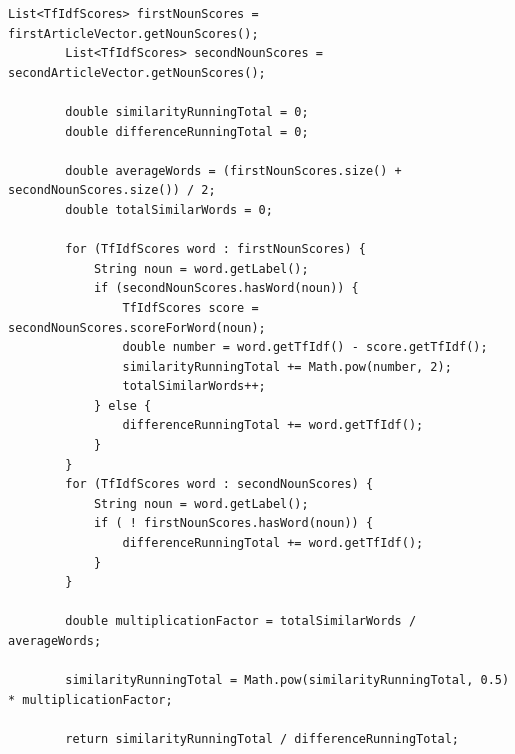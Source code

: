 \documentclass[12pt]{article}
\begin{document}
\begin{lstlisting}[style=MyJava, firstnumber=1, label={lst:clusteringsimilarity}, caption={Finding similarities between two ArticleVectors},captionpos=b]
	List<TfIdfScores> firstNounScores = firstArticleVector.getNounScores();
        List<TfIdfScores> secondNounScores = secondArticleVector.getNounScores();
        
        double similarityRunningTotal = 0;
        double differenceRunningTotal = 0;
        
        double averageWords = (firstNounScores.size() + secondNounScores.size()) / 2;
        double totalSimilarWords = 0;
        
        for (TfIdfScores word : firstNounScores) {
            String noun = word.getLabel();
            if (secondNounScores.hasWord(noun)) {
                TfIdfScores score = secondNounScores.scoreForWord(noun);
                double number = word.getTfIdf() - score.getTfIdf();
                similarityRunningTotal += Math.pow(number, 2);
                totalSimilarWords++;
            } else {
                differenceRunningTotal += word.getTfIdf();
            }
        }
        for (TfIdfScores word : secondNounScores) {
            String noun = word.getLabel();
            if ( ! firstNounScores.hasWord(noun)) {
                differenceRunningTotal += word.getTfIdf();
            }
        }
        
        double multiplicationFactor = totalSimilarWords / averageWords;
        
        similarityRunningTotal = Math.pow(similarityRunningTotal, 0.5) * multiplicationFactor;
        
        return similarityRunningTotal / differenceRunningTotal; 
        
\end{lstlisting}
\end{document}
